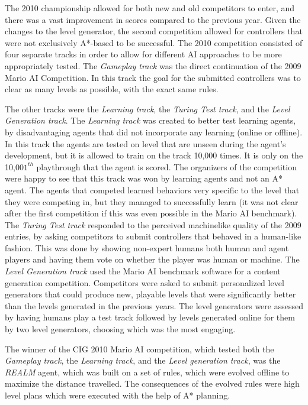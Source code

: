\documentclass[12pt]{article}
\begin{document}
\begin{multicols}{2}
The 2010 championship allowed for both new and old competitors to enter, and there was a vast improvement in scores compared to the previous year. Given the changes to the level generator, the second competition allowed for controllers that were not exclusively A*-based to be successful. The 2010 competition consisted of four separate tracks in order to allow for different AI approaches to be more appropriately tested. The \textit {Gameplay track} was the direct continuation of the 2009 Mario AI Competition. In this track the goal for the submitted controllers was to clear as many levels as possible, with the exact same rules. 

The other tracks were the \textit {Learning track}, the \textit {Turing Test track}, and the \textit {Level Generation track}. The \textit {Learning track} was created to better test learning agents, by disadvantaging agents that did not incorporate any learning (online or offline). In this track the agents are tested on level that are unseen during the agent's development, but it is allowed to train on the track 10,000 times. It is only on the 10,00$1^{th}$ playthrough that the agent is scored.  
The organizers of the competition were happy to see that this track was won by learning agents and 
not an A* agent.  The agents that competed learned behaviors very specific to the level that they 
were competing in, but they managed to successfully learn (it was not clear after the first competition 
if this was even possible in the Mario AI benchmark). 
The \textit {Turing Test track} responded to the perceived machinelike quality of the 2009 entries, by asking competitors to submit controllers that behaved in a human-like fashion. This was done by showing non-expert humans both human and agent players and having them vote on whether the player was human or machine. The \textit {Level Generation track} used the Mario AI benchmark software for a content generation competition. Competitors were asked to submit personalized level generators that could produce new, playable levels that were significantly better than the levels generated in the previous years. The level generators were assessed by having humans play a test track followed by levels generated online for them by two level generators, choosing which was the most engaging.

The winner of the CIG 2010 Mario AI competition, which tested both the \textit {Gameplay track}, the \textit {Learning track}, and the \textit {Level generation track}, was the \textit{REALM} agent, which was built on a set of rules, which were evolved offline to maximize the distance travelled. The consequences of the evolved rules were high level plans which were executed with the help of A* planning.


\end{multicols}
\end{document}
